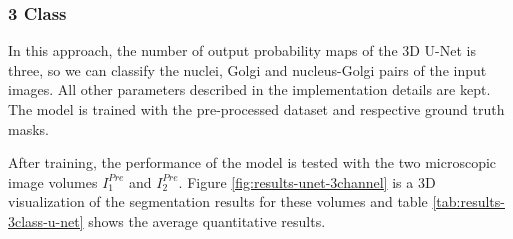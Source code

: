 \subsubsection*{3 Class}

In this approach, the number of output probability maps of the 3D U-Net is three, so we can classify the nuclei, Golgi and nucleus-Golgi pairs of the input images. All other parameters described in the implementation details are kept. The model is trained with the pre-processed dataset and respective ground truth masks.

After training, the performance of the model is tested with the two microscopic image volumes $I^{Pre}_1$ and $I^{Pre}_2$. Figure \ref{fig:results-unet-3channel} is a 3D visualization of the segmentation results for these volumes and table \ref{tab:results-3class-u-net} shows the average quantitative results.

